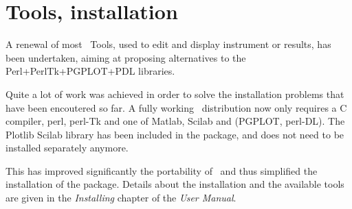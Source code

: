 \section{Tools, installation}
\label{s:new-features:tools}
  A renewal of most \MCS\ Tools, used to edit and display instrument or
  results,  has been undertaken, aiming at proposing alternatives to the
  Perl+PerlTk+PGPLOT+PDL  libraries.
  
  Quite a lot of work was achieved in order to solve the installation problems
   that have been encoutered so far. A fully working \MCS\ distribution now
   only requires a C compiler, perl, perl-Tk and one of Matlab, Scilab and
   (PGPLOT, perl-DL). The Plotlib Scilab library has  been included in the
   package, and does not need to be installed separately anymore.
  
  This has improved significantly the portability of \MCS\ and thus simplified
  the installation of the package. Details about the installation and the
  available tools are given in the {\it Installing \MCS} chapter of the {\it User Manual}.


